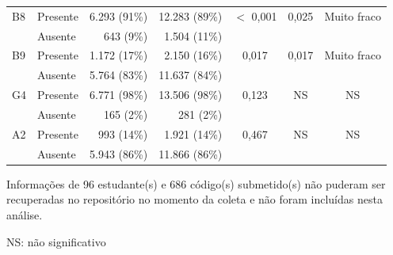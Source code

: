 \begin{table}[H]
\begin{threeparttable}
\begin{tabular}{ll rr ccc}
        \midrule
        B8 & Presente & 6.293 (91\%) & 12.283 (89\%) & $<$ 0,001 & 0,025 & Muito fraco \\
           & Ausente & 643 (9\%) & 1.504 (11\%) & & & \\
        \midrule
        B9 & Presente & 1.172 (17\%) & 2.150 (16\%) & 0,017 & 0,017 & Muito fraco \\
           & Ausente & 5.764 (83\%) & 11.637 (84\%) & & & \\
        \midrule
        G4 & Presente & 6.771 (98\%) & 13.506 (98\%) & 0,123 & NS & NS \\
           & Ausente & 165 (2\%) & 281 (2\%) & & & \\
        \midrule
        A2 & Presente & 993 (14\%) & 1.921 (14\%) & 0,467 & NS & NS \\
           & Ausente & 5.943 (86\%) & 11.866 (86\%) & & & \\
        \bottomrule
    \end{tabular}

    \begin{tablenotes}
        \item Informações de 96 estudante(s) e 686 código(s) submetido(s) não puderam ser recuperadas no repositório no momento da coleta e não foram incluídas nesta análise.
        \item NS: não significativo
    \end{tablenotes}
    \end{threeparttable}
\end{table}

